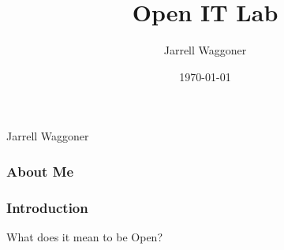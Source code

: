 \documentclass{beamer}
\title[Students]{Open IT Lab}
\author{Jarrell Waggoner}
\institute[Open IT Lab] {Open IT Lab\\
  \medskip
      {\emph{waggonej@email.sc.edu}} }
\date{\today}
\begin{document}
\rm

{
  \begin{frame}
    \vspace{18em}

    \begin{center}\large{\textcolor{beamer@mygrey}{Jarrell Waggoner}}\end{center}


  \end{frame}
}

\begin{frame}
  \frametitle{About Me}
\end{frame}

\begin{frame}
  \frametitle{Introduction}
  \begin{center}\begin{LARGE}What does it mean to be Open?\end{LARGE}\end{center}
\end{frame}
\end{document}
